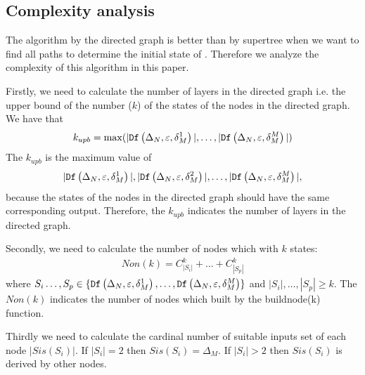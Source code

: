 \subsection{Complexity analysis}
The algorithm by the directed graph is better than by supertree when we want to find all paths to determine the initial state of \BCNs. Therefore we analyze the complexity of this algorithm in this paper. 

Firstly, we need to calculate the number of layers in the directed graph i.e. the upper bound of the number ($k$) of the states of the nodes in the directed graph. We have that 
\begin{equation}
\begin{split}
k_{upb}= \max(|{\tt Df}\left(\Delta_N,\varepsilon,\delta_M^1\right)|,\ldots,|{\tt Df}\left(\Delta_N,\varepsilon,\delta_M^M\right)|)
\end{split}
\end{equation}
The $k_{upb}$ is the maximum value of \[|{\tt Df}\left(\Delta_N,\varepsilon,\delta_M^1\right)|,|{\tt Df}\left(\Delta_N,\varepsilon,\delta_M^2\right)|,\ldots,|{\tt Df}\left(\Delta_N,\varepsilon,\delta_M^M\right)|,\] because the states of the nodes in the directed graph should have the same corresponding output. Therefore, the $k_{upb}$ indicates the number of layers in the directed graph.

Secondly, we need to calculate the number of nodes which with $k$ states:
\begin{equation}
\begin{split}
Non(k)= C_{|S_i|}^k+\ldots +C_{|S_p|}^k
\end{split}
\end{equation}
where $S_i\ldots,S_p\in\{{\tt Df}\left(\Delta_N,\varepsilon,\delta_M^1\right),\ldots,{\tt Df}\left(\Delta_N,\varepsilon,\delta_M^M\right)\}$ and $|S_i|,\ldots,|S_p|\ge k$. The $Non(k)$ indicates the number of nodes which built by the {\sf buildnode}(k) function.

Thirdly we need to calculate the cardinal number of suitable inputs set of each node $|Sis(S_i)|$. If $|S_i|=2$ then $Sis(S_i)=\Delta_M$. If $|S_i|>2$ then $Sis(S_i)$ is derived by other nodes. 

